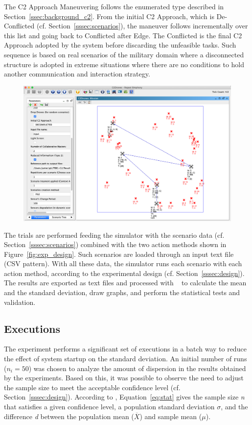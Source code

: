 The C2 Approach \color{black}Maneuvering \color{black}follows the enumerated type described in Section~\ref{ssec:background_c2}. From the initial C2 Approach, which is De-Conflicted (cf. Section~\ref{sssec:scenarios}), the maneuver follows incrementally over this list and going back to Conflicted after Edge. The Conflicted is the final C2 Approach adopted by the system before discarding the unfeasible tasks. Such sequence is based on real scenarios of the military domain where a disconnected structure is adopted in extreme situations where there are no conditions to hold another communication and interaction strategy.


\begin{figure}[ht]
  \centering
  \includegraphics[width=0.7\linewidth]{img/repast01.png}
  \label{fig:repast01}
\end{figure}


The trials are performed feeding the simulator with the scenario data (cf. Section~\ref{sssec:scenarios}) combined with the two action methods shown in Figure~\ref{fig:exp_design}. Such scenarios are loaded through an input text file (CSV pattern). With all these data, the simulator runs each scenario with each action method, according to the experimental design (cf. Section~\ref{sssec:design}). The results are exported as text files and processed with ~\citep{stat002,R_G} to calculate the mean and the standard deviation, draw graphs, and perform the statistical tests and validation.


\subsection{Executions}
\label{subsec:operations}

The experiment performs a significant set of executions in a batch way to reduce the effect of system startup on the standard deviation. An initial number of runs ($n_i=50$) was chosen to analyze the amount of dispersion in the results obtained by the experiments. Based on this, it was possible to observe the need to adjust the sample size to meet the acceptable confidence level (cf. Section~\ref{sssec:design}). According to \citet{CochranW.G.1983}, Equation~\ref{eq:stat} gives the sample size \emph{n} that satisfies a given confidence level, a population standard deviation $\sigma$, and the difference \emph{d} between the population mean ($\overline{X}$) and sample mean ($\mu$).

